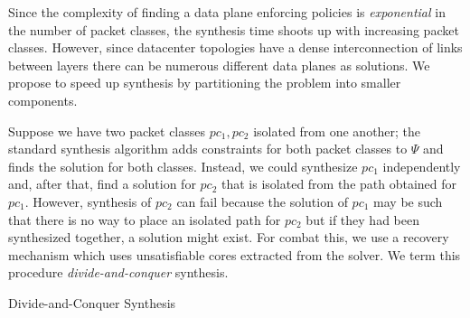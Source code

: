 Since the complexity of finding a
data plane enforcing policies is \emph{exponential} in the
number of packet classes, the synthesis time shoots up with increasing
packet classes. 
However, since datacenter topologies have a dense interconnection of
links between layers there can be
numerous different data planes as solutions.
We propose to speed up synthesis by partitioning the problem 
into smaller components.

Suppose we have two packet classes $pc_1,
pc_2$ isolated from one another; the standard synthesis algorithm adds 
constraints for both packet classes to $\Psi$ and 
finds the solution for both classes. 
Instead, we could synthesize $pc_1$
independently and, after that, find a solution for $pc_2$ 
that is isolated from the
path obtained for $pc_1$. 
However, synthesis of $pc_2$ can fail because the solution
of $pc_1$ may be such that there is no way to place an isolated path for
$pc_2$ but if they had been synthesized together, a
solution might exist. For combat this, we use a recovery 
mechanism which uses unsatisfiable cores extracted from the solver.
We term this
procedure \emph{divide-and-conquer} synthesis.

% 
\begin{algorithm}[t]
	\caption{Divide-and-Conquer Synthesis}
	\label{dcsyn}
	\begin{algorithmic}[1]
		\Else
		  \EndIf
		 \label{lst:line:solrecstart}
		  \EndIf
		\Else
		\EndIf
		\EndWhile \label{lst:line:solrecend}
		\EndIf
		\EndProcedure
	\end{algorithmic}

\end{algorithm}

